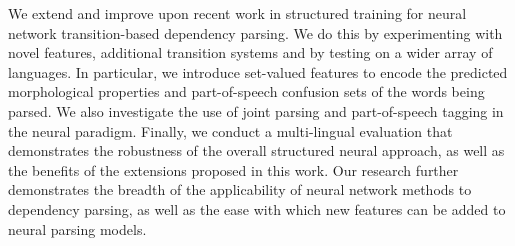We extend and improve upon recent work in structured training for neural network transition-based dependency parsing. We do this by experimenting with novel features, additional transition systems and by testing on a wider array of languages.  In particular, we introduce set-valued features to encode the predicted morphological properties and part-of-speech confusion sets of the words being parsed.  We also investigate the use of joint parsing and part-of-speech tagging in the neural paradigm. Finally, we conduct a multi-lingual evaluation that demonstrates the robustness of the overall structured neural approach, as well as the benefits of the extensions proposed in this work.  Our research further demonstrates the breadth of the applicability of neural network methods to dependency parsing, as well as the ease with which new features can be added to neural parsing models.
